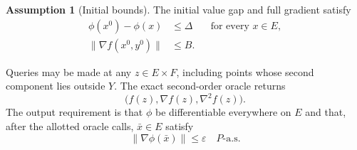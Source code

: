 \documentclass[10pt]{article}
\theoremstyle{definition}
\newtheorem{assumption}{Assumption}
\begin{document}
\begin{assumption}[Initial bounds]
The initial value gap and full gradient satisfy
\[
\begin{aligned}
\phi(x^0)-\phi(x)&\leq\Delta
&&\text{for every }x\in E,\\
\|\nabla f(x^0,y^0)\|&\leq B.
\end{aligned}
\]
\end{assumption}

Queries may be made at any $z\in E\times F$, including points whose second component lies outside $Y$. The exact second-order oracle returns
\[
\bigl(f(z),\nabla f(z),\nabla^2 f(z)\bigr).
\]
The output requirement is that $\phi$ be differentiable everywhere on $E$ and that, after the allotted oracle calls, $\bar{x}\in E$ satisfy
\[
\|\nabla\phi(\bar{x})\|\leq\varepsilon
\quad P\text{-a.s.}
\]
\end{document}
